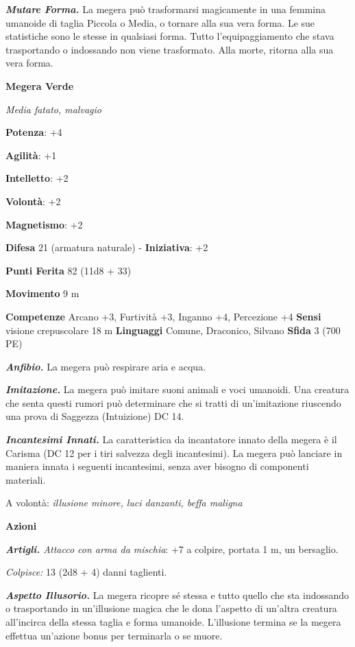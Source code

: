 \begin{multicols}{2}
\emph{\textbf{Mutare Forma.}} La megera può trasformarsi magicamente in
una femmina umanoide di taglia Piccola o Media, o tornare alla sua vera
forma. Le sue statistiche sono le stesse in qualsiasi forma. Tutto
l'equipaggiamento che stava trasportando o indossando non viene
trasformato. Alla morte, ritorna alla sua vera forma.



\textbf{Megera Verde}

\emph{Media fatato, malvagio}

\textbf{Potenza}: +4

\textbf{Agilità}: +1

\textbf{Intelletto}: +2

\textbf{Volontà}: +2

\textbf{Magnetismo}: +2

\textbf{Difesa} 21 (armatura naturale) - \textbf{Iniziativa}: +2

\textbf{Punti Ferita} 82 (11d8 + 33)

\textbf{Movimento} 9 m

\textbf{Competenze} Arcano +3, Furtività +3, Inganno +4, Percezione +4
\textbf{Sensi} visione crepuscolare 18 m
\textbf{Linguaggi} Comune, Draconico, Silvano \textbf{Sfida} 3 (700 PE)\smallskip

\emph{\textbf{Anfibio.}} La megera può respirare aria e acqua.

\emph{\textbf{Imitazione.}} La megera può imitare suoni animali e voci
umanoidi. Una creatura che senta questi rumori può determinare che si
tratti di un'imitazione riuscendo una prova di Saggezza (Intuizione) DC
14.

\emph{\textbf{Incantesimi Innati.}} La caratteristica da incantatore
innato della megera è il Carisma (DC 12 per i tiri salvezza degli
incantesimi). La megera può lanciare in maniera innata i seguenti
incantesimi, senza aver bisogno di componenti materiali.

A volontà: \emph{illusione minore, luci danzanti, beffa maligna}

\smallskip\textbf{Azioni}

\emph{\textbf{Artigli.} Attacco con arma da mischia}: +7 a colpire,
portata 1 m, un bersaglio.

\emph{Colpisce:} 13 (2d8 + 4) danni taglienti.

\emph{\textbf{Aspetto Illusorio.}} La megera ricopre sé stessa e tutto
quello che sta indossando o trasportando in un'illusione magica che le
dona l'aspetto di un'altra creatura all'incirca della stessa taglia e
forma umanoide. L'illusione termina se la megera effettua un'azione
bonus per terminarla o se muore.


\end{multicols}

